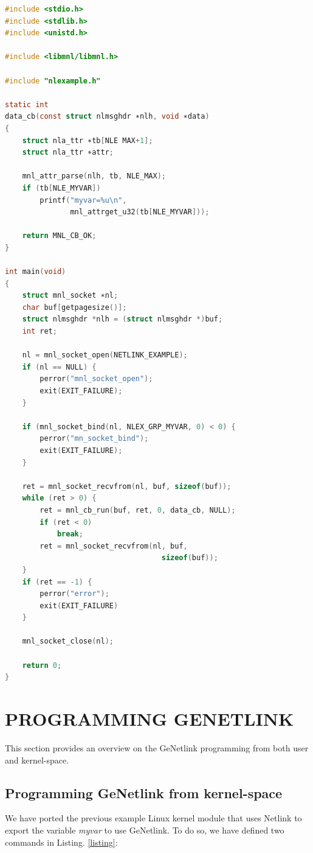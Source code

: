 \documentclass[10pt,onecolumn]{article}
\begin{document}
\begin{lstlisting}[language=C, caption=\textit{event.c} program, label=listing8]
#include <stdio.h>
#include <stdlib.h>
#include <unistd.h>

#include <libmnl/libmnl.h>

#include "nlexample.h"

static int
data_cb(const struct nlmsghdr ∗nlh, void ∗data)
{
    struct nla_ttr ∗tb[NLE MAX+1];
    struct nla_ttr ∗attr;

    mnl_attr_parse(nlh, tb, NLE_MAX);
    if (tb[NLE_MYVAR])
        printf("myvar=%u\n",
               mnl_attrget_u32(tb[NLE_MYVAR]));

    return MNL_CB_OK;
}

int main(void)
{
    struct mnl_socket ∗nl;
    char buf[getpagesize()];
    struct nlmsghdr *nlh = (struct nlmsghdr *)buf;
    int ret;

    nl = mnl_socket_open(NETLINK_EXAMPLE);
    if (nl == NULL) {
        perror("mnl_socket_open");
        exit(EXIT_FAILURE);
    }

    if (mnl_socket_bind(nl, NLEX_GRP_MYVAR, 0) < 0) {
        perror("mn_socket_bind");
        exit(EXIT_FAILURE);
    }

    ret = mnl_socket_recvfrom(nl, buf, sizeof(buf));
    while (ret > 0) {
        ret = mnl_cb_run(buf, ret, 0, data_cb, NULL);
        if (ret < 0)
            break;
        ret = mnl_socket_recvfrom(nl, buf,
                                    sizeof(buf));
    }
    if (ret == -1) {
        perror("error");
        exit(EXIT_FAILURE)
    }

    mnl_socket_close(nl);

    return 0;
}
\end{lstlisting}

\section{PROGRAMMING GENETLINK}
This section provides an overview on the GeNetlink programming from both user and kernel-space.

\subsection{Programming GeNetlink from kernel-space}

We have ported the previous example Linux kernel module that uses Netlink to export the variable \textit{myvar} to use GeNetlink. To do so, we have defined two commands in Listing. \ref{listing}:
\end{document}
